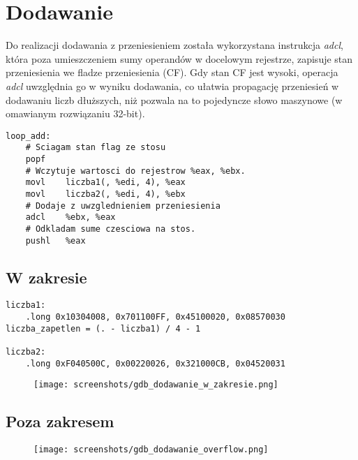 \section{Dodawanie}

Do realizacji dodawania z przeniesieniem została wykorzystana instrukcja \textit{adcl}, która poza umieszczeniem sumy operandów w docelowym rejestrze, zapisuje stan przeniesienia we fladze przeniesienia (CF). Gdy stan CF jest wysoki, operacja \textit{adcl} uwzględnia go w wyniku dodawania, co ułatwia propagację przeniesień w dodawaniu liczb dłuższych, niż pozwala na to pojedyncze słowo maszynowe (w omawianym rozwiązaniu 32-bit).

\begin{lstlisting}[language={[x86masm]Assembler}, caption={Pętla realizująca dodawanie.}]
loop_add:
    # Sciagam stan flag ze stosu
    popf
    # Wczytuje wartosci do rejestrow %eax, %ebx.
    movl    liczba1(, %edi, 4), %eax
    movl    liczba2(, %edi, 4), %ebx
    # Dodaje z uwzglednieniem przeniesienia
    adcl    %ebx, %eax
    # Odkladam sume czesciowa na stos.
    pushl   %eax
\end{lstlisting}

\subsection{W zakresie}


\begin{lstlisting}[language={[x86masm]Assembler}, caption={Pętla realizująca dodawanie.}]
    liczba1:
    .long 0x10304008, 0x701100FF, 0x45100020, 0x08570030
liczba_zapetlen = (. - liczba1) / 4 - 1

liczba2:
    .long 0xF040500C, 0x00220026, 0x321000CB, 0x04520031
    \end{lstlisting}
    

\begin{figure}[H]
    \texttt{[image: screenshots/gdb\_dodawanie\_w\_zakresie.png]}
\end{figure}

\subsection{Poza zakresem}

\begin{figure}[H]
    \texttt{[image: screenshots/gdb\_dodawanie\_overflow.png]}
\end{figure}
  